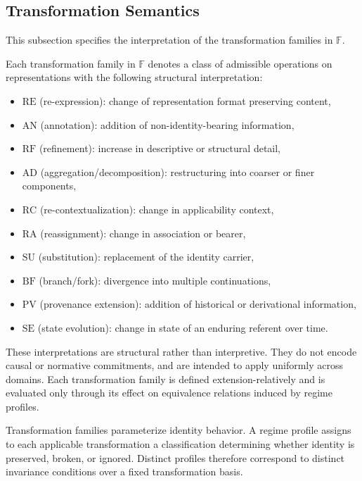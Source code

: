 \subsection{Transformation Semantics}
\label{subsec:transformation_semantics}

This subsection specifies the interpretation
of the transformation families in $\mathbb{F}$.

\begin{definition}
\label{def:transformation_semantics}
Each transformation family in $\mathbb{F}$ denotes a class of admissible
operations on representations with the following structural interpretation:
\begin{itemize}
\item $\mathrm{RE}$ (re-expression): change of representation format preserving content,
\item $\mathrm{AN}$ (annotation): addition of non-identity-bearing information,
\item $\mathrm{RF}$ (refinement): increase in descriptive or structural detail,
\item $\mathrm{AD}$ (aggregation/decomposition): restructuring into coarser or finer components,
\item $\mathrm{RC}$ (re-contextualization): change in applicability context,
\item $\mathrm{RA}$ (reassignment): change in association or bearer,
\item $\mathrm{SU}$ (substitution): replacement of the identity carrier,
\item $\mathrm{BF}$ (branch/fork): divergence into multiple continuations,
\item $\mathrm{PV}$ (provenance extension): addition of historical or derivational information,
\item $\mathrm{SE}$ (state evolution): change in state of an enduring referent over time.
\end{itemize}
\end{definition}


These interpretations are structural rather than interpretive.
They do not encode causal or normative commitments,
and are intended to apply uniformly across domains.
Each transformation family is defined extension-relatively
and is evaluated only through its effect on
equivalence relations induced by regime profiles.



Transformation families parameterize identity behavior.
A regime profile assigns to each applicable transformation
a classification determining whether identity is preserved,
broken, or ignored.
Distinct profiles therefore correspond
to distinct invariance conditions
over a fixed transformation basis.


